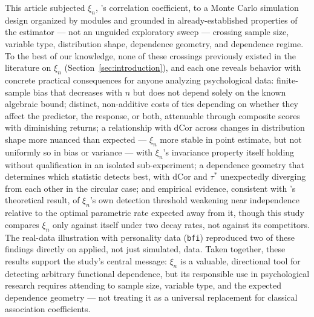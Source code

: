 \documentclass[article]{ajs}
\begin{document}
This article subjected $\xi_n$, \citet{chatterjee2021}'s correlation
coefficient, to a Monte Carlo simulation design organized by modules
and grounded in already-established properties of the estimator ---
not an unguided exploratory sweep --- crossing sample size, variable
type, distribution shape, dependence geometry, and dependence regime.
To the best of our knowledge, none of these crossings previously
existed in the literature on $\xi_n$ (Section~\ref{sec:introduction}),
and each
one reveals behavior with concrete practical consequences for anyone
analyzing psychological data: finite-sample bias that decreases with
$n$ but does not depend solely on the known algebraic bound; distinct,
non-additive costs of ties depending on whether they affect the
predictor, the response, or both, attenuable through composite scores
with diminishing returns; a relationship with dCor across changes in
distribution shape more nuanced than expected --- $\xi_n$ more stable
in point estimate, but not uniformly so in bias or variance --- with
$\xi_n$'s invariance property itself holding without qualification in
an isolated sub-experiment; a dependence geometry that determines
which statistic detects best, with dCor and $\tau^\ast$ unexpectedly
diverging from each other in the circular case; and empirical evidence,
consistent with \citet{auddy2024}'s theoretical result, of $\xi_n$'s
own detection threshold weakening near independence relative to the
optimal parametric rate expected away from it, though this study
compares $\xi_n$ only against itself under two decay rates, not against
its competitors. The real-data illustration with personality data
(\texttt{bfi}) reproduced two of
these findings directly on applied, not just simulated, data. Taken
together, these results support the study's central message: $\xi_n$
is a valuable, directional tool for detecting arbitrary functional
dependence, but its responsible use in psychological research requires
attending to sample size, variable type, and the expected dependence
geometry --- not treating it as a universal replacement for classical
association coefficients.

%

\end{document}
